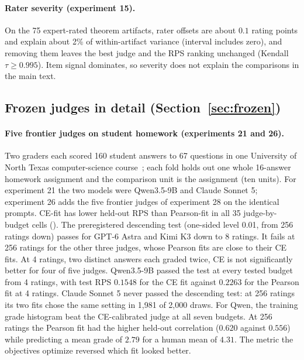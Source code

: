 \paragraph{Rater severity (experiment 15).}
On the 75 expert-rated theorem artifacts, rater offsets are about $0.1$ rating points and explain about 2\% of within-artifact variance (interval includes zero), and removing them leaves the best judge and the RPS ranking unchanged (Kendall $\tau\ge0.995$).
Item signal dominates, so severity does not explain the comparisons in the main text.

\subsection{Frozen judges in detail (Section~\ref{sec:frozen})}
\label{app:extra-frozen}

\paragraph{Five frontier judges on student homework (experiments 21 and 26).}
Two graders each scored 160 student answers to 67 questions in one University of North Texas computer-science course~\citep{mohler2011learning}; each fold holds out one whole 16-answer homework assignment and the comparison unit is the assignment (ten units).
For experiment 21 the two models were Qwen3.5-9B and Claude Sonnet 5; experiment 26 adds the five frontier judges of experiment 28 on the identical prompts.
CE-fit has lower held-out RPS than Pearson-fit in all 35 judge-by-budget cells (). The preregistered descending test (one-sided level 0.01, from 256 ratings down) passes for GPT-6 Astra and Kimi K3 down to 8 ratings. It fails at 256 ratings for the other three judges, whose Pearson fits are close to their CE fits.
At 4 ratings, two distinct answers each graded twice, CE is not significantly better for four of five judges.
Qwen3.5-9B passed the test at every tested budget from 4 ratings, with test RPS $0.1548$ for the CE fit against $0.2263$ for the Pearson fit at 4 ratings. Claude Sonnet 5 never passed the descending test: at 256 ratings its two fits chose the same setting in 1{,}981 of 2{,}000 draws.
For Qwen, the training grade histogram beat the CE-calibrated judge at all seven budgets. At 256 ratings the Pearson fit had the higher held-out correlation ($0.620$ against $0.556$) while predicting a mean grade of $2.79$ for a human mean of $4.31$. The metric the objectives optimize reversed which fit looked better.

